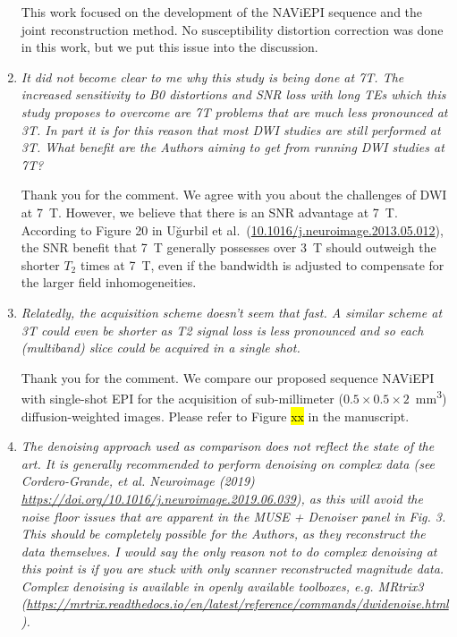 \documentclass[a4paper,11pt,twoside]{report}
\begin{document}
\begin{enumerate}
    \hspace{1em} This work focused on the development of
    the NAViEPI sequence and
    the joint reconstruction method.
    No susceptibility distortion correction was done in this work,
    but we put this issue into the discussion.


    \item \textit{It did not become clear to me why this study is being done at 7T. The increased sensitivity to B0 distortions and SNR loss with long TEs which this study proposes to overcome are 7T problems that are much less pronounced at 3T. In part it is for this reason that most DWI studies are still performed at 3T. What benefit are the Authors aiming to get from running DWI studies at 7T?}

    \hspace{1em} Thank you for the comment.
    We agree with you about the challenges of DWI at 7~T.
    However, we believe that there is an SNR advantage at 7~T.
    According to Figure 20 in U\u{g}urbil et al.~(\href{https://doi.org/10.1016/j.neuroimage.2013.05.012}{10.1016/j.neuroimage.2013.05.012}),
    the SNR benefit that 7~T generally possesses over 3~T
    should outweigh the shorter $T_2$ times at 7~T,
    even if the bandwidth is adjusted to compensate
    for the larger field inhomogeneities.


    \item \textit{Relatedly, the acquisition scheme doesn't seem that fast. A similar scheme at 3T could even be shorter as T2 signal loss is less pronounced and so each (multiband) slice could be acquired in a single shot.}

    \hspace{1em} Thank you for the comment.
    We compare our proposed sequence NAViEPI with single-shot EPI
    for the acquisition of sub-millimeter
    ($0.5 \times 0.5 \times 2$~\si{mm^3}) diffusion-weighted images.
    Please refer to Figure \hl{xx} in the manuscript.

    \item \textit{The denoising approach used as comparison does not reflect the state of the art. It is generally recommended to perform denoising on complex data (see Cordero-Grande, et al. Neuroimage (2019) \url{https://doi.org/10.1016/j.neuroimage.2019.06.039}), as this will avoid the noise floor issues that are apparent in the MUSE + Denoiser panel in Fig. 3. This should be completely possible for the Authors, as they reconstruct the data themselves. I would say the only reason not to do complex denoising at this point is if you are stuck with only scanner reconstructed magnitude data. Complex denoising is available in openly available toolboxes, e.g. MRtrix3 (\url{https://mrtrix.readthedocs.io/en/latest/reference/commands/dwidenoise.html}).}


\end{enumerate}
\end{document}
